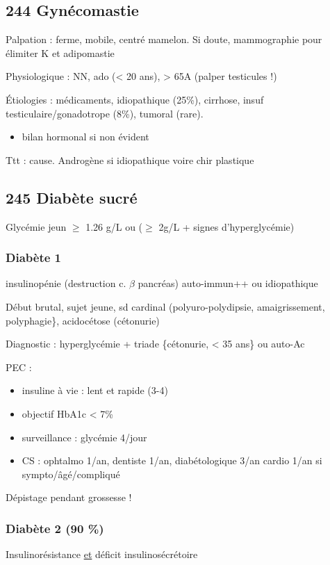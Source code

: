 \documentclass[11pt]{article}
\begin{document}
\subsection{244 Gynécomastie}
\label{sec:orgf733888}
Palpation : ferme, mobile, centré mamelon. Si doute, mammographie pour élimiter
K et adipomastie

Physiologique : NN, ado (< 20 ans), > 65A (palper testicules !)

Étiologies : médicaments, idiopathique (25\%), cirrhose, insuf
testiculaire/gonadotrope (8\%), tumoral (rare).
\begin{itemize}
\item bilan hormonal si non évident
\end{itemize}

Ttt : cause. Androgène si idiopathique voire chir plastique
\subsection{245 Diabète sucré}
\label{sec:orgd638cbb}
Glycémie jeun \(\ge\) 1.26 g/L  ou (\(\ge\) 2g/L + signes d'hyperglycémie)
\subsubsection{Diabète 1}
\label{sec:org94c6f65}
insulinopénie (destruction c. \(\beta\) pancréas) auto-immun++ ou idiopathique

Début brutal, sujet jeune, sd cardinal (polyuro-polydipsie, amaigrissement,
polyphagie\}, acidocétose (cétonurie)

Diagnostic : hyperglycémie + triade \{cétonurie, < 35 ans\} ou auto-Ac

PEC : 
\begin{itemize}
\item insuline à vie : lent et rapide (3-4)
\item objectif HbA1c < 7\%
\item surveillance : glycémie 4/jour
\item CS : ophtalmo 1/an, dentiste 1/an, diabétologique 3/an \textpm{} cardio 1/an
si sympto/âgé/compliqué
\end{itemize}

Dépistage pendant grossesse !

\subsubsection{Diabète 2 (90 \%)}
\label{sec:org6d032c8}
Insulinorésistance \uline{et} déficit insulinosécrétoire
\end{document}
